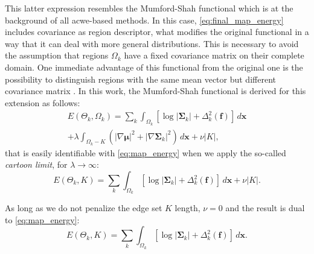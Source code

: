 This latter expression resembles the Mumford-Shah functional 
\citep{mumford_optimal_1989} which is at the background of all \gls{acwe}-based
methods. In this case, \eqref{eq:final_map_energy} includes covariance as
region descriptor, what modifies the original functional in a way that it 
can deal with more general distributions. This is necessary to avoid the 
assumption that regions $\Omega_k$ have a fixed covariance matrix on their 
complete domain. One immediate advantage of this functional from the original 
one is the possibility to distinguish regions with the same mean vector but 
different covariance matrix \citep{brox_local_2009}. In this work, the 
Mumford-Shah functional is derived for this extension as follows:
\begin{multline}
E(\Theta_k,\Omega_k) = \sum\limits_k \int_{\Omega_k} \left[ \log \left|\mathbf{\Sigma}_k\right| + \Delta^2_k (\mathbf{f}) \right] \,d\mathbf{x} \\
+ \lambda \int_{\Omega_k - K}  ( \left| \nabla \mathbf{\mu} \right| ^2 + \left| \nabla \mathbf{\Sigma}_k \right| ^2 ) \, d\mathbf{x} 
+ \nu |K|,
\end{multline}
that is easily identifiable with \eqref{eq:map_energy} when we apply 
the so-called \emph{cartoon limit}, 
for $\lambda \to \infty$:
\begin{equation}
E(\Theta_k,K) = \sum\limits_k \int_{\Omega_k} \left[ \log \left|\mathbf{\Sigma}_k\right| + \Delta^2_k (\mathbf{f}) \right] \,d\mathbf{x}
+ \nu |K|.
\end{equation}

As long as we do not penalize the edge set $K$ length, $\nu = 0$ and
the result is dual to \eqref{eq:map_energy}:
\begin{equation}
E(\Theta_k,K) = \sum\limits_k \int_{\Omega_k} \left[ \log \left|\mathbf{\Sigma}_k\right| + \Delta^2_k (\mathbf{f}) \right] \,d\mathbf{x}.
\end{equation}


